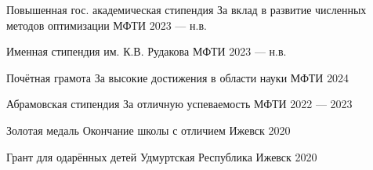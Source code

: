 
\begin{cvhonors}

  \cvhonor
    {Повышенная гос. академическая стипендия} %
    {За вклад в развитие численных методов оптимизации} %
    {МФТИ} %
    {2023 — н.в.} %

  \cvhonor
    {Именная стипендия им. К.В. Рудакова} %
    {} %
    {МФТИ} %
    {2023 — н.в.} %

  \cvhonor
    {Почётная грамота} %
    {За высокие достижения в области науки} %
    {МФТИ} %
    {2024} %

  \cvhonor
    {Абрамовская стипендия} %
    {За отличную успеваемость} %
    {МФТИ} %
    {2022 — 2023} %

  \cvhonor
    {Золотая медаль} %
    {Окончание школы с отличием} %
    {Ижевск} %
    {2020} %

  \cvhonor
    {Грант для одарённых детей} %
    {Удмуртская Республика} %
    {Ижевск} %
    {2020} %

\end{cvhonors}
